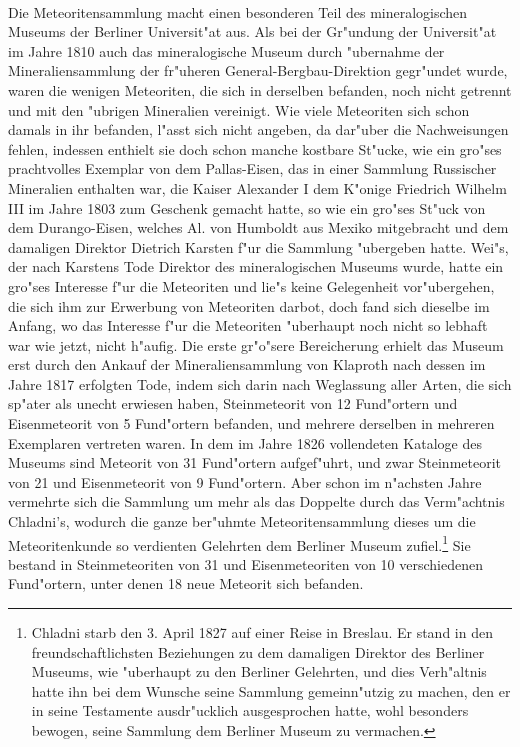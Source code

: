 \documentclass[a4paper, 11pt, oneside]{article}
\begin{document}
\paragraph{}
Die Meteoritensammlung macht einen besonderen Teil des mineralogischen Museums der Berliner Universit"at aus. Als bei der Gr"undung der Universit"at im Jahre 1810 auch das mineralogische Museum durch "ubernahme der Mineraliensammlung der fr"uheren General-Bergbau-Direktion gegr"undet wurde, waren die wenigen Meteoriten, die sich in derselben befanden, noch nicht getrennt und mit den "ubrigen Mineralien vereinigt. Wie viele Meteoriten sich schon damals in ihr befanden, l"asst sich nicht angeben, da dar"uber die Nachweisungen fehlen, indessen enthielt sie doch schon manche kostbare St"ucke, wie ein gro"ses prachtvolles Exemplar von dem Pallas-Eisen, das in einer Sammlung Russischer Mineralien enthalten war, die Kaiser Alexander I dem K"onige Friedrich Wilhelm III im Jahre 1803 zum Geschenk gemacht hatte, so wie ein gro"ses St"uck von dem Durango-Eisen, welches Al. von Humboldt aus Mexiko mitgebracht und dem damaligen Direktor Dietrich Karsten f"ur die Sammlung "ubergeben hatte. Wei"s, der nach Karstens Tode Direktor des mineralogischen Museums wurde, hatte ein gro"ses Interesse f"ur die Meteoriten und lie"s keine Gelegenheit vor"ubergehen, die sich ihm zur Erwerbung von Meteoriten darbot, doch fand sich dieselbe im Anfang, wo das Interesse f"ur die Meteoriten "uberhaupt noch nicht so lebhaft war wie jetzt, nicht h"aufig. Die erste gr"o"sere Bereicherung erhielt das Museum erst durch den Ankauf der Mineraliensammlung von Klaproth nach dessen im Jahre 1817 erfolgten Tode, indem sich darin nach Weglassung aller Arten, die sich sp"ater als unecht erwiesen haben, Steinmeteorit von 12 Fund"ortern und Eisenmeteorit von 5 Fund"ortern befanden, und mehrere derselben in mehreren Exemplaren vertreten waren. In dem im Jahre 1826 vollendeten Kataloge des Museums sind Meteorit von 31 Fund"ortern aufgef"uhrt, und zwar Steinmeteorit von 21 und Eisenmeteorit von 9 Fund"ortern. Aber schon im n"achsten Jahre vermehrte sich die Sammlung um mehr als das Doppelte durch das Verm"achtnis Chladni's, wodurch die ganze ber"uhmte Meteoritensammlung dieses um die Meteoritenkunde so verdienten Gelehrten dem Berliner Museum zufiel.\footnote{Chladni starb den 3. April 1827 auf einer Reise in Breslau. Er stand in den freundschaftlichsten Beziehungen zu dem damaligen Direktor des Berliner Museums, wie "uberhaupt zu den Berliner Gelehrten, und dies Verh"altnis hatte ihn bei dem Wunsche seine Sammlung gemeinn"utzig zu machen, den er in seine Testamente ausdr"ucklich ausgesprochen hatte, wohl besonders bewogen, seine Sammlung dem Berliner Museum zu vermachen.} Sie bestand in Steinmeteoriten von 31 und Eisenmeteoriten von 10 verschiedenen Fund"ortern, unter denen 18 neue Meteorit sich befanden.
\end{document}
